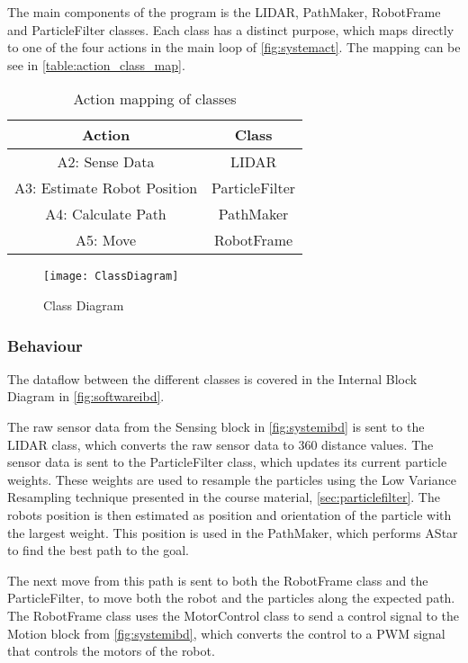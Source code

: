 \documentclass[Main]{subfiles}
\begin{document}
		The main components of the program is the LIDAR, PathMaker, RobotFrame and ParticleFilter classes. 
		Each class has a distinct purpose, which maps directly to one of the four  actions in the main loop of \autoref{fig:systemact}.
		The mapping can be see in \autoref{table:action_class_map}.
		 
		\begin{table}[H]
			\centering
			\begin{tabular}{|c|c|}
			\hline
				Action & Class \\ 
			\hline
				A2: Sense Data & LIDAR  \\ 
			\hline
				A3: Estimate Robot Position & ParticleFilter  \\ 
			\hline
				A4: Calculate Path & PathMaker  \\ 
			\hline
				A5: Move & RobotFrame  \\ 
			\hline
			\end{tabular}
			\caption{Action mapping of classes}
			\label{table:action_class_map} 
		\end{table} \noindent
		
		\begin{figure}[H]
			\centering
			\texttt{[image: ClassDiagram]}
			\caption{Class Diagram}
			\label{fig:classdiagram}
		\end{figure}
		
	\subsubsection{Behaviour} %
	\label{subsub:software_behaviour}

		The dataflow between the different classes is covered in the Internal Block Diagram in \autoref{fig:softwareibd}.

		The raw sensor data from the Sensing block in \autoref{fig:systemibd} is sent to the LIDAR class, which  converts the raw sensor data to 360 distance values.
		The sensor data is sent to the ParticleFilter class, which updates its current particle weights. 
		These weights are used to resample the particles using the Low Variance Resampling technique presented in the course material, \autoref{sec:particlefilter}.
		The robots position is then estimated as position and orientation of the particle with the largest weight.
		This position is used in the PathMaker, which performs AStar to find the best path to the goal. 

		The next move from this path is sent to both the RobotFrame class and the ParticleFilter, to move both the robot and the particles along the expected path.
		The RobotFrame class uses the MotorControl class to send a control signal to the Motion block from \autoref{fig:systemibd}, which converts the control to a PWM signal that controls the motors of the robot.
		
\end{document}
